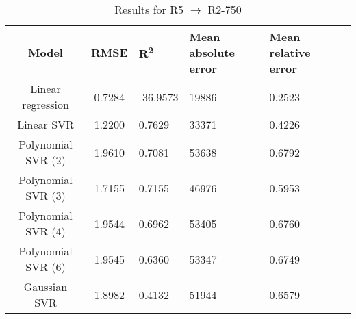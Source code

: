 \begin{table}[H]
\centering
\begin{adjustbox}{center}
\begin{tabular}{c | c M{1.2cm} M{2.5cm} M{2.5cm} M{1.8cm}}
Model & RMSE & R\textsuperscript{2} & Mean absolute error & Mean relative error \tabularnewline
\hline
Linear regression & 0.7284 & -36.9573 &  19886 & 0.2523 \\
Linear SVR & 1.2200 & 0.7629 &  33371 & 0.4226 \\
Polynomial SVR (2) & 1.9610 & 0.7081 &  53638 & 0.6792 \\
Polynomial SVR (3) & 1.7155 & 0.7155 &  46976 & 0.5953 \\
Polynomial SVR (4) & 1.9544 & 0.6962 &  53405 & 0.6760 \\
Polynomial SVR (6) & 1.9545 & 0.6360 &  53347 & 0.6749 \\
Gaussian SVR & 1.8982 & 0.4132 &  51944 & 0.6579 \\
\end{tabular}
\end{adjustbox}
\\
\caption{Results for R5 $\rightarrow$ R2-750}
\label{tab:coreonly_linear_R5_R2_750}
\end{table}
